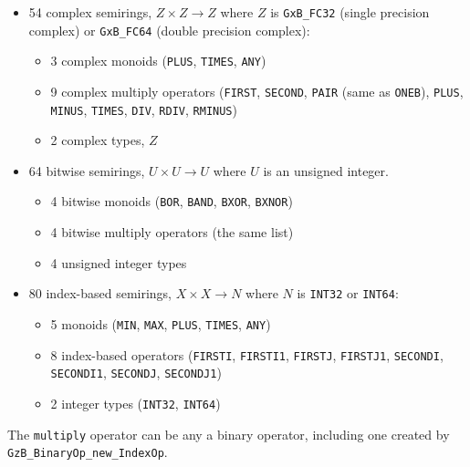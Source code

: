 \documentclass[12pt]{article}
\begin{document}
\begin{itemize}
\item 54 complex semirings, $Z \times Z \rightarrow Z$ where $Z$ is
    \verb'GxB_FC32' (single precision complex) or
    \verb'GxB_FC64' (double precision complex):

    \vspace{-0.05in}
    \begin{itemize}
    \item 3 complex monoids (\verb'PLUS', \verb'TIMES', \verb'ANY')
    \item 9 complex multiply operators
        (\verb'FIRST', \verb'SECOND', \verb'PAIR' (same as \verb'ONEB'),
        \verb'PLUS', \verb'MINUS',
            \verb'TIMES', \verb'DIV', \verb'RDIV', \verb'RMINUS')
    \item 2 complex types, $Z$
    \end{itemize}

\item 64 bitwise semirings, $U \times U \rightarrow U$ where $U$ is
    an unsigned integer.

    \vspace{-0.05in}
    \begin{itemize}
    \item 4 bitwise monoids (\verb'BOR', \verb'BAND', \verb'BXOR', \verb'BXNOR')
    \item 4 bitwise multiply operators (the same list)
    \item 4 unsigned integer types
    \end{itemize}

\item 80 index-based semirings, $X \times X \rightarrow N$ where $N$ is
    \verb'INT32' or \verb'INT64':

    \vspace{-0.05in}
    \begin{itemize}
    \item 5 monoids (\verb'MIN', \verb'MAX', \verb'PLUS', \verb'TIMES', \verb'ANY')
    \item 8 index-based operators
        (\verb'FIRSTI', \verb'FIRSTI1', \verb'FIRSTJ', \verb'FIRSTJ1',
        \verb'SECONDI', \verb'SECONDI1', \verb'SECONDJ', \verb'SECONDJ1')
    \item 2 integer types (\verb'INT32', \verb'INT64')
    \end{itemize}

\end{itemize}
%
The \verb'multiply' operator can be any a binary operator, including one
created by \verb'GzB_BinaryOp_new_IndexOp'.
\end{document}
